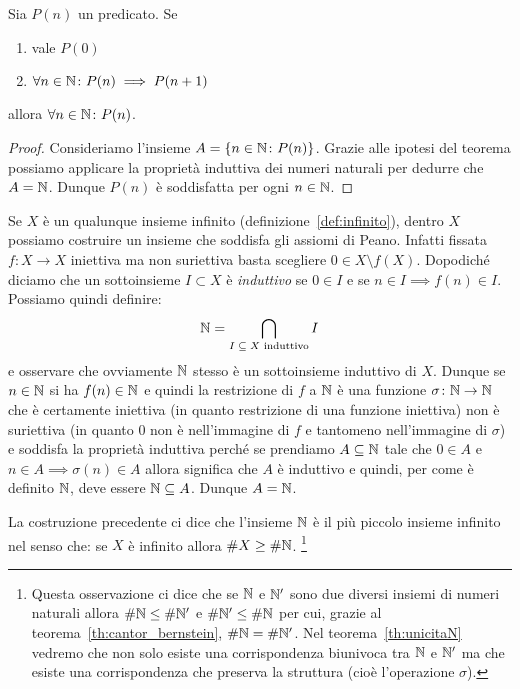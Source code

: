 \begin{theorem}
  Sia $P(n)$ un predicato.
  Se 
  \begin{enumerate}
    \item vale $P(0)$
    \item $\forall n\in {\mathbb N}\colon P(n)\implies P(n+1)$
  \end{enumerate} 
  allora $\forall n\in {\mathbb N}\colon P(n)$.
\end{theorem}
%
\begin{proof}
  Consideriamo l'insieme $A=\{n\in {\mathbb N}\colon P(n)\}$.
  Grazie alle ipotesi del teorema possiamo applicare la proprietà 
  induttiva dei numeri naturali per dedurre che $A={\mathbb N}$.
  Dunque $P(n)$ è soddisfatta per ogni $n\in{\mathbb N}$.
\end{proof}

Se $X$ è un qualunque insieme infinito (definizione~\ref{def:infinito}), 
dentro $X$ possiamo costruire un insieme che soddisfa gli assiomi di Peano.
Infatti fissata $f\colon X\to X$ iniettiva ma non suriettiva 
basta scegliere $0\in X\setminus f(X)$. 
Dopodiché diciamo che un sottoinsieme $I\subset X$ è \emph{induttivo}%
%
se $0\in I$ e se $n\in I\implies f(n)\in I$. Possiamo quindi definire:
\[
  {\mathbb N} = \bigcap_{\text{$I\subseteq X$ induttivo}} I
\]
e osservare che ovviamente ${\mathbb N}$ stesso è un sottoinsieme induttivo di $X$.
Dunque se $n\in {\mathbb N}$ si ha $f(n)\in {\mathbb N}$ e quindi la 
restrizione di $f$ a ${\mathbb N}$ è una funzione $\sigma\colon {\mathbb N}\to{\mathbb N}$ 
che è certamente iniettiva (in quanto restrizione di una funzione iniettiva)
non è suriettiva (in quanto $0$ non è nell'immagine di $f$ 
e tantomeno nell'immagine di $\sigma$) e soddisfa la proprietà induttiva 
perché se prendiamo $A\subseteq {\mathbb N}$ tale che $0\in A$ e $n\in A \implies \sigma(n) \in A$ 
allora significa che $A$ è induttivo e quindi, per come è definito ${\mathbb N}$,
deve essere ${\mathbb N}\subseteq A$. Dunque $A={\mathbb N}$.

La costruzione precedente ci dice che l'insieme ${\mathbb N}$ è il più piccolo insieme infinito
nel senso che: se $X$ è infinito allora $\# X \ge \# {\mathbb N}$. 
\footnote{Questa osservazione ci dice che se ${\mathbb N}$ e ${\mathbb N}'$ sono due diversi insiemi di 
numeri naturali allora $\#{\mathbb N}\le \#{\mathbb N}'$ e $\#{\mathbb N}'\le\#{\mathbb N}$ per cui, 
grazie al teorema~\ref{th:cantor_bernstein}, $\# {\mathbb N} = \# {\mathbb N}'$.
Nel teorema~\ref{th:unicitaN} vedremo che non solo esiste una corrispondenza biunivoca 
tra ${\mathbb N}$ e ${\mathbb N}'$ ma che esiste una corrispondenza che preserva la struttura (cioè l'operazione 
$\sigma$). 
}


